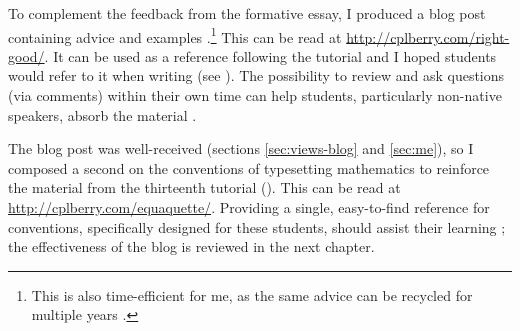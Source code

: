 To complement the feedback from the formative essay, I produced a blog post containing advice and examples \citep[chapter 4]{Irons2008}.\footnote{This is also time-efficient for me, as the same advice can be recycled for multiple years \citep[chapter 4]{Irons2008}.} This can be read at \url{http://cplberry.com/right-good/}. It can be used as a reference following the tutorial and I hoped students would refer to it when writing (see ). The possibility to review and ask questions (via comments) within their own time can help students, particularly non-native speakers, absorb the material \citep{Rainsbury2003}.

The blog post was well-received (sections \ref{sec:views-blog} and \ref{sec:me}), so I composed a second on the conventions of typesetting mathematics to reinforce the material from the thirteenth tutorial (). This can be read at \url{http://cplberry.com/equaquette/}. Providing a single, easy-to-find reference for conventions, specifically designed for these students, should assist their learning \citep[cf.][chapter 9]{Ramsden1992}; the effectiveness of the blog is reviewed in the next chapter.

